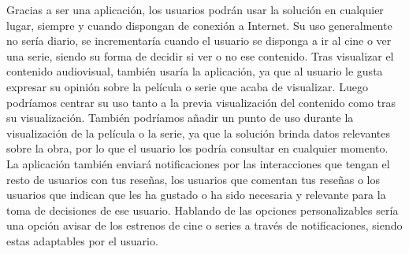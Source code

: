 Gracias a ser una aplicación, los usuarios podrán usar la solución en cualquier lugar, siempre y 
cuando dispongan de conexión a Internet. Su uso generalmente no sería diario, se incrementaría cuando 
el usuario se disponga a ir al cine o ver una serie, siendo su forma de decidir si ver o no ese 
contenido. Tras visualizar el contenido audiovisual, también usaría la aplicación, ya que al usuario le 
gusta expresar su opinión sobre la película o serie que acaba de visualizar. Luego podríamos centrar su 
uso tanto a la previa visualización del contenido como tras su visualización. También podríamos añadir 
un punto de uso durante la visualización de la película o la serie, ya que la solución brinda datos 
relevantes sobre la obra, por lo que el usuario los podría consultar en cualquier momento. La 
aplicación también enviará notificaciones por las interacciones que tengan el resto de usuarios con tus 
reseñas, los usuarios que comentan tus reseñas o los usuarios que indican que les ha gustado o ha sido 
necesaria y relevante para la toma de decisiones de ese usuario. Hablando de las opciones 
personalizables sería una opción avisar de los estrenos de cine o series a través de notificaciones, 
siendo estas adaptables por el usuario.

